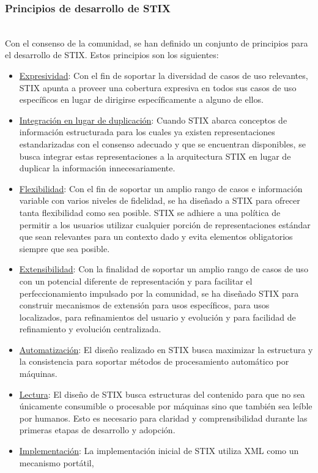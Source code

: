 \subsubsection{Principios de desarrollo de STIX}\ \\
Con el consenso de la comunidad, se han definido un conjunto de principios para el desarrollo de STIX. Estos principios son los siguientes:
\begin{itemize}
  \item \underline{Expresividad}: Con el fin de soportar la diversidad de casos de uso relevantes, STIX apunta a 
proveer una cobertura expresiva en todos sus casos de uso específicos en lugar 
de dirigirse específicamente a alguno de ellos.
  \item \underline{Integración en lugar de duplicación}: Cuando STIX abarca conceptos de información estructurada para los cuales ya 
existen representaciones estandarizadas con el consenso adecuado y que se 
encuentran disponibles, se busca integrar estas representaciones a la 
arquitectura STIX en lugar de duplicar la información innecesariamente.
\item \underline{Flexibilidad}: Con el fin de soportar un amplio rango de casos e información variable con 
varios niveles de fidelidad, se ha diseñado a STIX para ofrecer tanta flexibilidad 
como sea posible. STIX se adhiere a una política de permitir a los usuarios 
utilizar cualquier porción de representaciones estándar que sean relevantes para 
un contexto dado y evita elementos obligatorios siempre que sea posible.
\item \underline{Extensibilidad}: Con la finalidad de soportar un amplio rango de casos de uso con un potencial 
diferente de representación y para facilitar el perfeccionamiento 
impulsado por la comunidad, se ha diseñado STIX para construir mecanismos de 
extensión para usos específicos, para usos localizados, para refinamientos del 
usuario y evolución y para facilidad de refinamiento y evolución centralizada.
\item \underline{Automatización}: El diseño realizado en STIX busca maximizar la estructura y la consistencia para 
soportar métodos de procesamiento automático por máquinas.
\item \underline{Lectura}: El diseño de STIX busca estructuras del contenido para que no sea únicamente 
consumible o procesable por máquinas sino que también sea leíble por humanos. 
Esto es necesario para claridad y comprensibilidad durante las primeras etapas 
de desarrollo y adopción.
\item \underline{Implementación}: La implementación inicial de STIX utiliza XML como un mecanismo portátil, 

\end{itemize}
